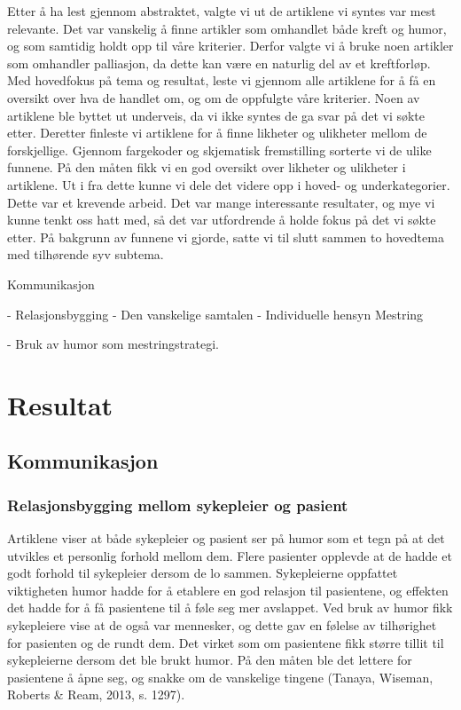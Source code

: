 Etter å ha lest gjennom abstraktet, valgte vi ut de artiklene vi syntes var
mest relevante. Det var vanskelig å finne artikler som omhandlet både kreft og
humor, og som samtidig holdt opp til våre kriterier. Derfor valgte vi å bruke
noen artikler som omhandler palliasjon, da dette kan være en naturlig del av et
kreftforløp. Med hovedfokus på tema og resultat, leste vi gjennom alle
artiklene for å få en oversikt over hva de handlet om, og om de oppfulgte våre
kriterier. Noen av artiklene ble byttet ut underveis, da vi ikke syntes de ga
svar på det vi søkte etter. Deretter finleste vi artiklene for å finne likheter
og ulikheter mellom de forskjellige. Gjennom fargekoder og skjematisk
fremstilling sorterte vi de ulike funnene. På den måten fikk vi en god oversikt
over likheter og ulikheter i artiklene. Ut i fra dette kunne vi dele det videre
opp i hoved- og underkategorier. Dette var et krevende arbeid. Det var mange
interessante resultater, og mye vi kunne tenkt oss hatt med, så det var
utfordrende å holde fokus på det vi søkte etter. På bakgrunn av funnene vi
gjorde, satte vi til slutt sammen to hovedtema med tilhørende syv subtema.

Kommunikasjon

	-         Relasjonsbygging
-         Den vanskelige samtalen
-         Individuelle hensyn
	Mestring

	-         Bruk av humor som
          mestringstrategi.

\chapter{Resultat}

\section{Kommunikasjon}

\subsection{Relasjonsbygging mellom sykepleier og pasient}

Artiklene viser at både sykepleier og pasient ser på humor som et tegn på at
det utvikles et personlig forhold mellom dem. Flere pasienter opplevde at de
hadde et godt forhold til sykepleier dersom de lo sammen. Sykepleierne
oppfattet viktigheten humor hadde for å etablere en god relasjon til
pasientene, og effekten det hadde for å få pasientene til å føle seg mer
avslappet. Ved bruk av humor fikk sykepleiere vise at de også var mennesker, og
dette gav en følelse av tilhørighet for pasienten og de rundt dem. Det virket
som om pasientene fikk større tillit til sykepleierne dersom det ble brukt
humor. På den måten ble det lettere for pasientene å åpne seg, og snakke om de
vanskelige tingene (Tanaya, Wiseman, Roberts \&{} Ream, 2013, s. 1297).

